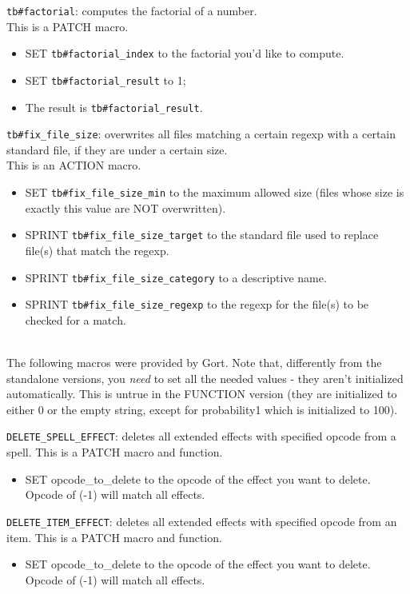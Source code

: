 \documentclass{article}
\begin{document}
\verb+tb#factorial+: computes the factorial of a number. \\
This is a PATCH macro.
\begin{itemize}
\item SET \verb+tb#factorial_index+ to the factorial you'd like to compute.
\item SET \verb+tb#factorial_result+ to 1;
\item The result is \verb+tb#factorial_result+.
\end{itemize}

\verb+tb#fix_file_size+: overwrites all files matching a certain regexp with a
certain standard file, if they are under a certain size. \\
This is an ACTION macro.
\begin{itemize}
\item SET \verb+tb#fix_file_size_min+ to the maximum allowed size
(files whose size is exactly this value are NOT overwritten).
\item SPRINT \verb+tb#fix_file_size_target+ to the standard file used to replace file(s) that match the regexp.
\item SPRINT \verb+tb#fix_file_size_category+ to a descriptive name.
\item SPRINT \verb+tb#fix_file_size_regexp+ to the regexp for the file(s) to be checked for a match.
\end{itemize}

\\

The following macros were provided by Gort. Note that, differently from the standalone versions, you \emph{need}
to set all the needed values - they aren't initialized automatically. This is untrue in the FUNCTION version
(they are initialized to either 0 or the empty string, except for probability1 which is initialized to 100).

\verb+DELETE_SPELL_EFFECT+: deletes all extended effects with specified opcode from a spell.
This is a PATCH macro and function.
\begin{itemize}
\item SET opcode_to_delete to the opcode of the effect you want to delete. Opcode of (-1) will match all effects.
\end{itemize}

\verb+DELETE_ITEM_EFFECT+: deletes all extended effects with specified opcode from an item.
This is a PATCH macro and function.
\begin{itemize}
\item SET opcode_to_delete to the opcode of the effect you want to delete. Opcode of (-1) will match all effects.
\end{itemize}
\end{document}
